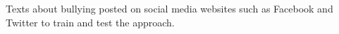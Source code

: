 Texts about bullying posted on social media websites such as Facebook and Twitter to train and test the approach.
